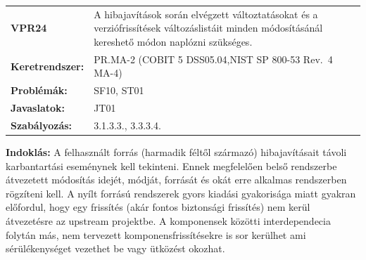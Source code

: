 \documentclass[12pt,magyar,a4paper,oneside]{scrreprt}
\begin{document}
\begin{longtable}[]{@{}ll@{}}
\toprule
\endhead
\begin{minipage}[t]{0.16\columnwidth}\raggedright
\textbf{VPR24}\strut
\end{minipage} & \begin{minipage}[t]{0.79\columnwidth}\raggedright
A hibajavítások során elvégzett változtatásokat és a verziófrissítések
változáslistáit minden módosításánál kereshető módon naplózni
szükséges.\strut
\end{minipage}\tabularnewline
\begin{minipage}[t]{0.16\columnwidth}\raggedright
\textbf{Keretrendszer:}\strut
\end{minipage} & \begin{minipage}[t]{0.79\columnwidth}\raggedright
PR.MA-2 (COBIT 5 DSS05.04,NIST SP 800-53 Rev.~4 MA-4)\strut
\end{minipage}\tabularnewline
\begin{minipage}[t]{0.16\columnwidth}\raggedright
\textbf{Problémák:}\strut
\end{minipage} & \begin{minipage}[t]{0.79\columnwidth}\raggedright
SF10, ST01\strut
\end{minipage}\tabularnewline
\begin{minipage}[t]{0.16\columnwidth}\raggedright
\textbf{Javaslatok:}\strut
\end{minipage} & \begin{minipage}[t]{0.79\columnwidth}\raggedright
JT01\strut
\end{minipage}\tabularnewline
\begin{minipage}[t]{0.16\columnwidth}\raggedright
\textbf{Szabályozás:}\strut
\end{minipage} & \begin{minipage}[t]{0.79\columnwidth}\raggedright
3.1.3.3., 3.3.3.4.\strut
\end{minipage}\tabularnewline
\bottomrule
\end{longtable}

\textbf{Indoklás: } A felhasznált forrás (harmadik féltől származó)
hibajavításait távoli karbantartási eseménynek kell tekinteni. Ennek
megfelelően belső rendszerbe átvezetett módosítás idejét, módját,
forrását és okát erre alkalmas rendszerben rögzíteni kell. A nyílt
forrású rendszerek gyors kiadási gyakorisága miatt gyakran előfordul,
hogy egy frissítés (akár fontos biztonsági frissítés) nem kerül
átvezetésre az upstream projektbe. A komponensek közötti interdependecia
folytán más, nem tervezett komponensfrissítésekre is sor kerülhet ami
sérülékenységet vezethet be vagy ütközést okozhat.
\end{document}
